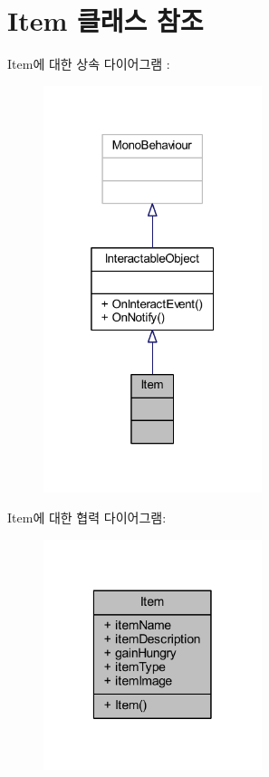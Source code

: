 \hypertarget{class_item}{}\section{Item 클래스 참조}
\label{class_item}


Item에 대한 상속 다이어그램 \+: 
\nopagebreak
\begin{figure}[H]
\begin{center}
\leavevmode
\includegraphics[width=181pt]{dc/dc7/class_item__inherit__graph}
\end{center}
\end{figure}


Item에 대한 협력 다이어그램\+:
\nopagebreak
\begin{figure}[H]
\begin{center}
\leavevmode
\includegraphics[width=181pt]{d2/d8b/class_item__coll__graph}
\end{center}
\end{figure}
